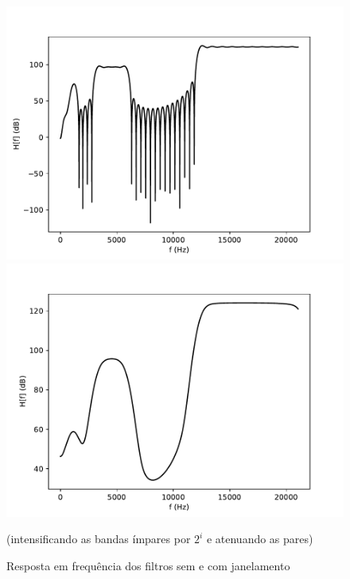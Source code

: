\begin{figure}[H]
        \includegraphics[scale=0.5]{fig/nowindow_stair.pdf}
    \endminipage
        \includegraphics[scale=0.5]{fig/windowed_stair.pdf}
        \endminipage
    \begin{center}
        \caption{Resposta em frequência dos filtros sem e com janelamento}
        \small{(intensificando as bandas ímpares por $2^i$ e atenuando as pares)}
        \label{fig:stair window}
    \end{center}
\end{figure}